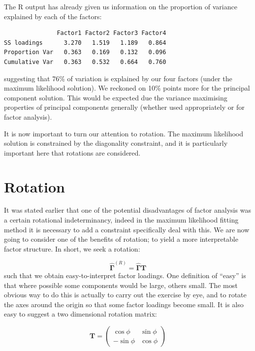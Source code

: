 The R output has already given us information on the proportion of variance explained by each of the factors:

\singlespacing
\begin{verbatim}
               Factor1 Factor2 Factor3 Factor4
SS loadings      3.270   1.519   1.189   0.864
Proportion Var   0.363   0.169   0.132   0.096
Cumulative Var   0.363   0.532   0.664   0.760
\end{verbatim}
\onehalfspacing

suggesting that 76\% of variation is explained by our four factors (under the maximum likelihood solution).   We reckoned on 10\% points more for the principal component solution.   This  would be expected due the variance maximising properties of principal components generally (whether used appropriately or for factor analysis).


It is now important to turn our attention to rotation.   The maximum likelihood solution is constrained by the diagonality constraint, and it is particularly important here that rotations are considered.


\section{Rotation}
\label{rotfa}

It was stated earlier that one of the potential disadvantages of factor analysis was a certain rotational indeterminancy, indeed in the maximum likelihood fitting method it is necessary to add a constraint specifically deal with this.   We are now going to consider one of the benefits of rotation; to yield a more interpretable factor structure.   In short, we seek a rotation: 

\begin{equation}
\boldsymbol{\hat{\Gamma}}^{(R)} = \boldsymbol{\hat{\Gamma}} \boldsymbol{T}
\end{equation}
such that we obtain easy-to-interpret factor loadings.   One definition of ``easy'' is that where possible some components would be large, others small.   The most obvious way to do this is actually to carry out the exercise by eye, and to rotate the axes around the origin so that some factor loadings become small.   It is also easy to suggest a two dimensional rotation matrix:

\begin{displaymath}
\boldsymbol{T} = \left( \begin{array}{rr} \cos \phi & \sin \phi \\
- \sin \phi & \cos \phi \end{array} \right)
\end{displaymath}

